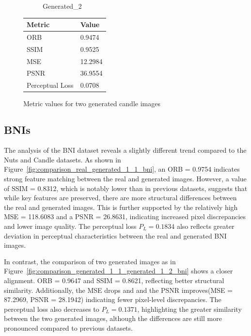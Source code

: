 \documentclass[12pt,DIV14,BCOR12mm,a4paper,footinclude=false,headinclude,parskip=half-,twoside,openright,cleardoublepage=empty,toc=index,bibliography=totoc,listof=totoc]{scrreprt}
\numberwithin{equation}{chapter}
\begin{document}
\begin{figure}
\begin{minipage}[H]{\linewidth}
\begin{minipage}[H]{0.5\linewidth}
\begin{subfigure}[t]{0.48\linewidth}
                \caption{Generated\_2}
            \end{subfigure}
        \end{minipage}%
        \hfill
        \begin{minipage}[H]{0.5\linewidth} %
            \centering
            \small
            \begin{tabular}{p{3cm} p{2cm}}
                \toprule
                \textbf{Metric} & \textbf{Value} \\
                \midrule
                ORB             & 0.9474        \\
                SSIM            & 0.9525        \\
                MSE             & 12.2984       \\
                PSNR            & 36.9554       \\
                Perceptual Loss & 0.0708        \\
                \bottomrule
            \end{tabular}
        \end{minipage}%
        \caption{Metric values for two generated candle images}
        \label{fig:comparison_generated_1_1_generated_1_2_candle}
    \end{minipage}
\end{figure}


\subsection{BNIs}

The analysis of the BNI dataset reveals a slightly different trend compared to the Nuts and Candle datasets. As shown in Figure~\ref{fig:comparison_real_generated_1_1_bni}, an ORB = 0.9754 indicates strong feature matching between the real and generated images. However, a value of SSIM = 0.8312, which is notably lower than in previous datasets, suggests that while key features are preserved, there are more structural differences between the real and generated images. This is further supported by the relatively high MSE = 118.6083 and a PSNR = 26.8631, indicating increased pixel discrepancies and lower image quality. The perceptual loss \( P_L = 0.1834 \) also reflects greater deviation in perceptual characteristics between the real and generated BNI images.

In contrast, the comparison of two generated images as in Figure~\ref{fig:comparison_generated_1_1_generated_1_2_bni} shows a closer alignment. ORB = 0.9647 and SSIM = 0.8621, reflecting better structural similarity. Additionally, the MSE drops and and the PSNR improves(MSE = 87.2969, PSNR = 28.1942) indicating fewer pixel-level discrepancies. The perceptual loss also decreases to \( P_L = 0.1371 \), highlighting the greater similarity between the two generated images, although the differences are still more pronounced compared to previous datasets.
\end{document}
